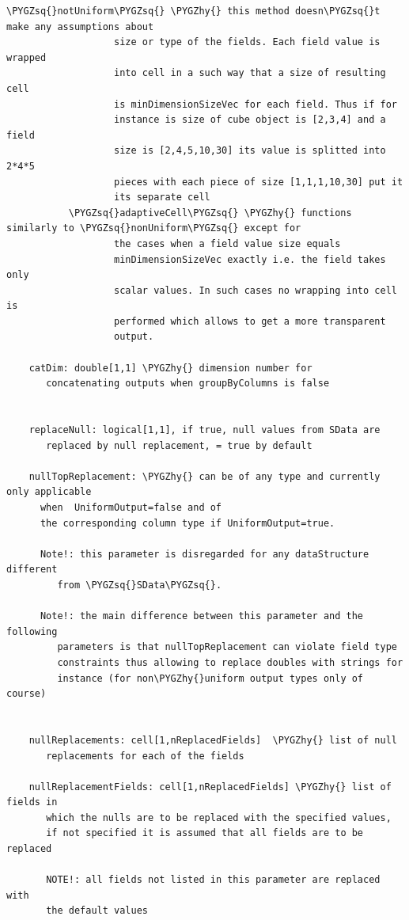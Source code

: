 \documentclass[letterpaper,10pt,english]{sphinxmanual}
\def\PYGZhy{\char`\-}
\def\PYGZsq{\char`\'}
\begin{document}
\begin{Verbatim}[commandchars=\\\{\}]
           \PYGZsq{}notUniform\PYGZsq{} \PYGZhy{} this method doesn\PYGZsq{}t make any assumptions about
                   size or type of the fields. Each field value is wrapped
                   into cell in a such way that a size of resulting cell
                   is minDimensionSizeVec for each field. Thus if for
                   instance is size of cube object is [2,3,4] and a field
                   size is [2,4,5,10,30] its value is splitted into 2*4*5
                   pieces with each piece of size [1,1,1,10,30] put it
                   its separate cell
           \PYGZsq{}adaptiveCell\PYGZsq{} \PYGZhy{} functions similarly to \PYGZsq{}nonUniform\PYGZsq{} except for
                   the cases when a field value size equals
                   minDimensionSizeVec exactly i.e. the field takes only
                   scalar values. In such cases no wrapping into cell is
                   performed which allows to get a more transparent
                   output.

    catDim: double[1,1] \PYGZhy{} dimension number for
       concatenating outputs when groupByColumns is false


    replaceNull: logical[1,1], if true, null values from SData are
       replaced by null replacement, = true by default

    nullTopReplacement: \PYGZhy{} can be of any type and currently only applicable
      when  UniformOutput=false and of
      the corresponding column type if UniformOutput=true.

      Note!: this parameter is disregarded for any dataStructure different
         from \PYGZsq{}SData\PYGZsq{}.

      Note!: the main difference between this parameter and the following
         parameters is that nullTopReplacement can violate field type
         constraints thus allowing to replace doubles with strings for
         instance (for non\PYGZhy{}uniform output types only of course)


    nullReplacements: cell[1,nReplacedFields]  \PYGZhy{} list of null
       replacements for each of the fields

    nullReplacementFields: cell[1,nReplacedFields] \PYGZhy{} list of fields in
       which the nulls are to be replaced with the specified values,
       if not specified it is assumed that all fields are to be replaced

       NOTE!: all fields not listed in this parameter are replaced with
       the default values



\end{Verbatim}
\end{document}

